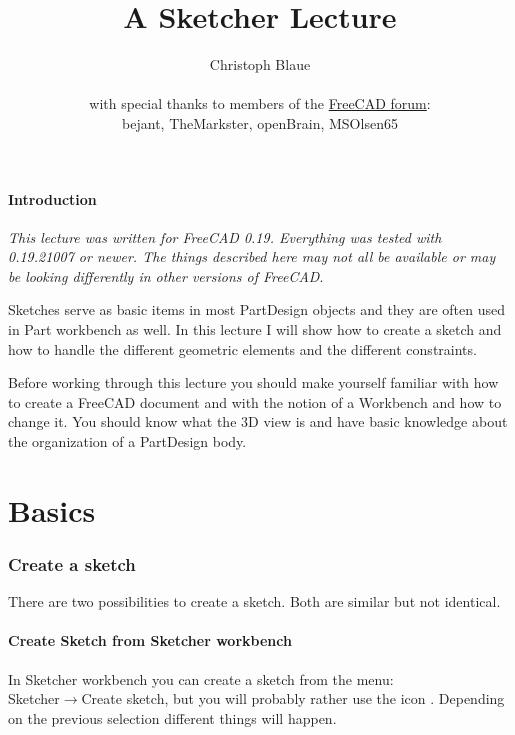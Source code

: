 \documentclass[12pt,titlepage]{article}
\title{A Sketcher Lecture}
\author{Christoph Blaue\\
\\
\scriptsize with special thanks to members of the \href{https://forum.freecadweb.org}{FreeCAD forum}:\\
\small bejant,
TheMarkster,
openBrain,
MSOlsen65
}
\newcommand{\menu}{\mbox{$\rightarrow$}}
\newcommand{\icon}[1]{\raisebox{-1em}{\rule{0pt}{27pt}\texttt{[image: images/\#1]}}}
\let\partOrigin\part
\renewcommand\part{\newpage\partOrigin}
\newcommand{\currentVersion}{0.19.21007}
\begin{document}
\maketitle
\setcounter{page}{2}

\tableofcontents
\newpage

\subsection*{Introduction}
{\em This lecture was written for FreeCAD 0.19. Everything was tested with
\currentVersion{} or newer. The things described here may not all be available or may
be looking differently in other versions of FreeCAD}.
\vspace{2.5em}

Sketches serve as basic items in most PartDesign objects and they are often
used in Part workbench as well. In this lecture I will show how to create a
sketch and how to handle the different geometric elements and the different
constraints.

Before working through this lecture you should make yourself familiar with
how to create a FreeCAD document and with the notion of a Workbench and how to change it. You
should know what the 3D view is and have basic knowledge about the organization
of a PartDesign body.

\part{Basics}

\section{Create a sketch}
There are two possibilities to create a sketch. Both are similar but not
identical.

\subsection{Create Sketch from Sketcher workbench}
In Sketcher workbench you can create a sketch from the menu:\\
Sketcher\menu Create sketch, but you will probably rather use the icon
\icon{Sketcher_NewSketch}. Depending on the previous selection different
things will happen.
\end{document}
